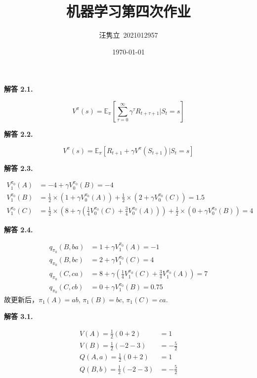 \documentclass[12pt, a4paper, oneside]{ctexart}
\title{\textbf{机器学习第四次作业}}
\author{汪隽立\ 2021012957}
\date{\today}
\newenvironment{solution}[1]{\par\noindent\textbf{解答 #1. }\par}{\par}
\begin{document}
\maketitle

\begin{solution}{2.1}
    \begin{equation}
        V^{\pi}(s) = \mathbb{E}_{\pi} \left[ \sum_{\tau=0}^{\infty} \gamma^\tau R_{t+\tau+1} \bigg| S_t = s \right] \nonumber
    \end{equation}
\end{solution}

\begin{solution}{2.2}
    \begin{equation}
        V^{\pi}(s) = \mathbb{E}_{\pi} \left[ R_{t+1}+\gamma V^{\pi}(S_{t+1})\bigg| S_t=s \right] \nonumber
    \end{equation}
\end{solution}

\begin{solution}{2.3}
    \begin{align}
        V_1^{\pi_0}(A)&=-4+\gamma V_0^{\pi_0}(B)=-4 \nonumber \\
        V_1^{\pi_0}(B)&=\frac{1}{2}\times(1+\gamma V_0^{\pi_0}(A))+\frac{1}{2}\times(2+\gamma V_0^{\pi_0}(C))=1.5 \nonumber \\ 
        V_1^{\pi_0}(C)&=\frac{1}{2}\times(8+\gamma (\frac{1}{4}V_0^{\pi_0}(C)+\frac{3}{4}V_0^{\pi_0}(A)))+\frac{1}{2}\times(0+\gamma V_0^{\pi_0}(B))=4 \nonumber
    \end{align}
\end{solution}

\begin{solution}{2.4}
    \begin{align}
        q_{\pi_0}(B,ba)&=1+\gamma V_1^{\pi_0}(A) = -1 \nonumber \\
        q_{\pi_0}(B,bc)&=2+\gamma V_1^{\pi_0}(C) = 4 \nonumber \\
        q_{\pi_0}(C,ca)&=8+\gamma (\frac{1}{4}V_1^{\pi_0}(C) + \frac{3}{4}V_1^{\pi_0}(A)) = 7 \nonumber \\
        q_{\pi_0}(C,cb)&=0+\gamma V_1^{\pi_0}(B) = 0.75 \nonumber
    \end{align}
    故更新后，$\pi_1(A)=ab$, $\pi_1(B)=bc$, $\pi_1(C)=ca$.
\end{solution}

\begin{solution}{3.1}
    \begin{align}
        V(A)=\frac{1}{2}(0+2)&=1 \nonumber \\
        V(B)=\frac{1}{2}(-2-3)&=-\frac{5}{2} \nonumber \\ 
        Q(A,a)=\frac{1}{2}(0+2)&=1 \nonumber \\
        Q(B,b)=\frac{1}{2}(-2-3)&=-\frac{5}{2} \nonumber
    \end{align}
\end{solution}
\end{document}
